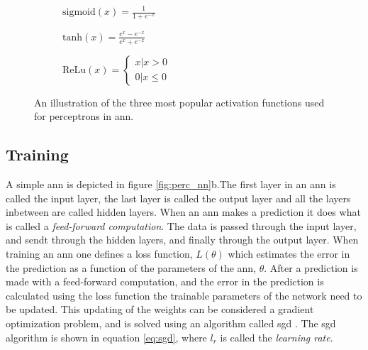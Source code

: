 \begin{figure}[H]
    \centering
    \begin{subfigure}[b]{0.32\textwidth}
        \centering
        
        \caption{$\mathrm{sigmoid}(x) = \frac{1}{1+e^{-x}}$}
        \label{fig:sigmoid}
    \end{subfigure}
    \begin{subfigure}[b]{0.32\textwidth}
        \centering
        
        \caption{$\mathrm{tanh}(x) = \frac{e^{x}-e^{-x}}{e^{x}+e^{-x}}$}
        \label{fig:tanh}
    \end{subfigure}
    \begin{subfigure}[b]{0.32\textwidth}
        \centering
        
        \caption{$\mathrm{ReLu}(x) = \left\{\begin{matrix}x | x>0\\ 0 | x \leq 0\end{matrix}\right.$}
        \label{fig:relu}
    \end{subfigure}
    \caption{An illustration of the three most popular activation functions used for perceptrons in \acrshort{ann}.}
    \label{fig:obj_funcs}
\end{figure}

\subsection{Training} \label{sec:nn_training}
A simple \acrshort{ann} is depicted in figure \ref{fig:perc_nn}b.The first layer in an \acrshort{ann} is called the input layer, the last layer is called the output layer and all the layers inbetween are called hidden layers. When an \acrshort{ann} makes a prediction it does what is called a \textit{feed-forward computation}. The data is passed through the input layer, and sendt through the hidden layers, and finally through the output layer. When training an \acrshort{ann} one defines a loss function, $L(\theta)$ which estimates the error in the prediction as a function of the parameters of the \acrshort{ann}, $\theta$. After a prediction is made with a feed-forward computation, and the error in the prediction is calculated using the loss function the trainable parameters of the network need to be updated. This updating of the weights can be considered a gradient optimization problem, and is solved using an algorithm called \acrfull{sgd} \cite{dl_book}. The \acrshort{sgd} algorithm is shown in equation \eqref{eq:sgd}, where $l_r$ is called the \textit{learning rate}.

